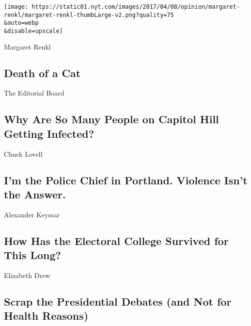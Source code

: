 \href{/2020/08/03/opinion/feral-cat-dying.html}{}

\texttt{[image: https://static01.nyt.com/images/2017/04/08/opinion/margaret-renkl/margaret-renkl-thumbLarge-v2.png?quality=75\\\&auto=webp\\\&disable=upscale]}

Margaret Renkl

\hypertarget{death-of-a-cat}{%
\subsection{Death of a Cat}\label{death-of-a-cat}}

\href{/2020/08/02/opinion/coronavirus-gohmert-congress-testing.html}{}

The Editorial Board

\hypertarget{why-are-so-many-people-on-capitol-hill-getting-infected}{%
\subsection{Why Are So Many People on Capitol Hill Getting
Infected?}\label{why-are-so-many-people-on-capitol-hill-getting-infected}}

\href{/2020/08/03/opinion/portland-protests-police-chief.html}{}

Chuck Lovell

\hypertarget{im-the-police-chief-in-portland-violence-isnt-the-answer}{%
\subsection{I'm the Police Chief in Portland. Violence Isn't the
Answer.}\label{im-the-police-chief-in-portland-violence-isnt-the-answer}}

\href{/2020/08/03/opinion/electoral-college-racism-white-supremacy.html}{}

Alexander Keyssar

\hypertarget{how-has-the-electoral-college-survived-for-this-long}{%
\subsection{How Has the Electoral College Survived for This
Long?}\label{how-has-the-electoral-college-survived-for-this-long}}

\href{/2020/08/03/opinion/trump-biden-presidential-debates-2020.html}{}

Elizabeth Drew

\hypertarget{scrap-the-presidential-debates-and-not-for-health-reasons}{%
\subsection{Scrap the Presidential Debates (and Not for Health
Reasons)}\label{scrap-the-presidential-debates-and-not-for-health-reasons}}

